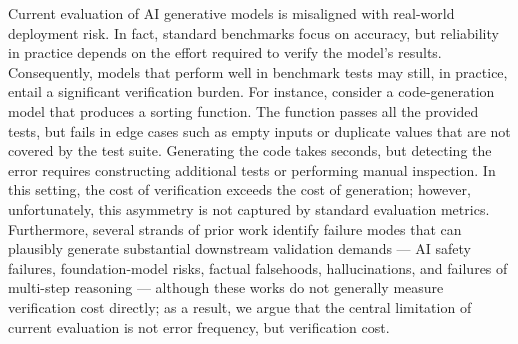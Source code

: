 \documentclass[11pt]{article}
\newcommand{\cfix}[1]{\textcolor{green!50!black}{#1}}
\newcommand{\cfix}[1]{#1}
\begin{document}
Current evaluation of AI generative models is misaligned with real-world deployment risk. In fact, standard benchmarks focus on accuracy, but reliability in practice depends on the effort required to verify the model's results.
Consequently, models that perform well in benchmark tests may still, in practice, entail a significant verification burden.
For instance, consider a code-generation model that produces a sorting function. The function passes all the provided tests, but fails in edge cases such as empty inputs or duplicate values that are not covered by the test suite. Generating the code takes seconds, but detecting the error requires constructing additional tests or performing manual inspection. In this setting, the cost of verification exceeds the cost of generation; however, unfortunately, this asymmetry is not captured by standard evaluation metrics.
\cfix{Furthermore, several strands of prior work identify failure modes that can plausibly generate substantial downstream validation demands --- AI safety failures, foundation-model risks, factual falsehoods, hallucinations, and failures of multi-step reasoning \citep{amodei2016concrete, bommasani2021foundation, lin2022truthfulqa, li2023halueval, creswell2023selection} --- although these works do not generally measure verification cost directly;}
as a result, we argue that the central limitation of current evaluation is not error frequency, but verification cost.
\end{document}

